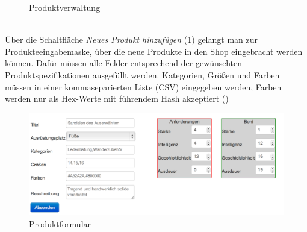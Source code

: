 \begin{figure}[h!]
  \centering
  \caption{Produktverwaltung}
  \label{fig:Produktverwaltung}
\end{figure}
\text{}\vspace*{-1em}\\
Über die Schaltfläche \textit{Neues Produkt hinzufügen} (1) gelangt man zur Produkteeingabemaske, über die neue Produkte in den Shop eingebracht werden können. Dafür müssen alle Felder entsprechend der gewünschten Produktspezifikationen ausgefüllt werden. Kategorien, Größen und Farben müssen in einer kommaseparierten Liste (CSV) eingegeben werden, Farben werden nur als Hex-Werte mit führendem Hash akzeptiert ()

\begin{figure}[h!]
  \centering
  \includegraphics[width=\textwidth]{img/Produktformular.png}
  \caption{Produktformular}
  \label{fig:Produktformular}
\end{figure}

